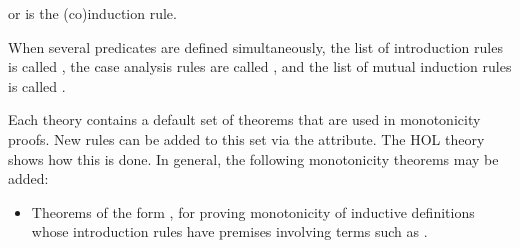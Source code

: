 \begin{isabellebody}
\begin{isamarkuptext}
\begin{description}
  \item {} or  is the (co)induction
  rule.

  \end{description}

  When several predicates  are
  defined simultaneously, the list of introduction rules is called
  , the case analysis rules are
  called , and the list
  of mutual induction rules is called .%
\end{isamarkuptext}%
\isamarkuptrue%
%
\isamarkuptrue%
%
\begin{isamarkuptext}%
Each theory contains a default set of theorems that are used in
  monotonicity proofs.  New rules can be added to this set via the
  \hyperlink{attribute.HOL.mono}{\mbox{}} attribute.  The HOL theory 
  shows how this is done.  In general, the following monotonicity
  theorems may be added:

  \begin{itemize}

  \item Theorems of the form , for proving
  monotonicity of inductive definitions whose introduction rules have
  premises involving terms such as .


\end{itemize}
\end{isamarkuptext}
\end{isabellebody}
